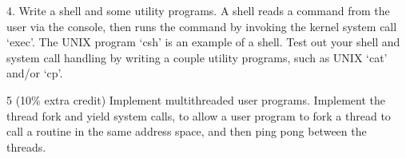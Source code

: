 \begin{description}
\item{4.}
Write a shell and some utility programs.  A shell reads a command 
from the user via the console, then runs the command by invoking
the kernel system call `exec'.
The UNIX program `csh' is an example of a shell.  
Test out your shell and system call handling by writing a couple 
utility programs, such as UNIX `cat' and/or `cp'.

\item{5 (10\% extra credit)} Implement multithreaded user programs.
Implement the thread fork and yield system calls, to allow a user
program to fork a thread to call a routine in the same address space,
and then ping pong between the threads.

\end{description}

